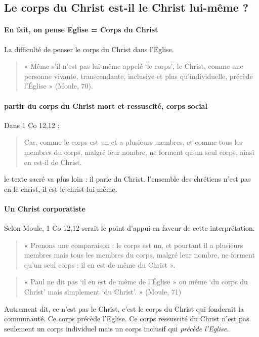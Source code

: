  
 \subsection{Le corps du Christ est-il le Christ lui-même ?}
 
 \paragraph{En fait, on pense Eglise = Corps du Christ} 
 La difficulté de penser le corps du Christ dans l'Eglise. 

 
 \begin{quote}
     « Même s’il n’est pas lui-même appelé ‘le corps’, le Christ, comme une personne vivante, transcendante, inclusive et plus qu’individuelle, précède l’Église » (Moule, 70).
 \end{quote}
 
  \paragraph{partir du corps du Christ mort et ressuscité, corps social}
 Dans 1 Co 12,12 : 
 \begin{quote}
     Car, comme le corps est un et a plusieurs membres, et comme tous les membres du corps, malgré leur nombre, ne forment qu'un seul corps, ainsi en est-il de Christ.
 \end{quote}
 le texte sacré va plus loin : il parle du Christ. l'ensemble des chrétiens n'est pas en le christ, il est le christ lui-même. 
 \paragraph{Un Christ corporatiste}
 Selon Moule, 1 Co 12,12 serait le point d’appui en faveur de cette interprétation. 
 \begin{quote}
     « Prenons une comparaison : le corps est un, et pourtant il a plusieurs membres  mais tous les membres du corps, malgré leur nombre, ne forment qu’un seul corps : il en est de même du Christ ».
 \end{quote}
 
 \begin{quote}
     «  Paul ne dit pas ‘il en est de même de l’Église » ou même ‘du corps du Christ’ mais simplement ‘du Christ’. » (Moule, 71)
 \end{quote}
 Autrement dit, ce n'est pas le Christ, c'est le corps du Christ qui fonderait la communauté.
 Ce corps précède l'Eglise. Ce corps ressuscité du Christ n'est pas seulement un corps individuel mais un corps inclusif qui \textit{précède l'Eglise}. 
